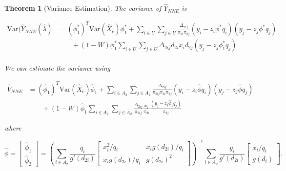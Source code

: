 \documentclass[12pt]{article}
\newtheorem{theorem}{Theorem}
\newcommand{\Var}{{\text{Var}}}
\begin{document}
\begin{theorem}[Variance Estimation]
  The variance of $\hat Y_{NNE}$ is 

  \begin{align*}
    \Var(\hat Y_{NNE}(\hat \lambda)
    &= (\phi_1^*)^T \Var(\hat X_c) \phi_1^* + 
    \sum_{i \in U} \sum_{j \in U} \frac{\Delta_{2ij}}{\pi_{2i}\pi_{2j}} 
      (y_i - z_i \phi^* q_i)(y_j - z_j \phi^* q_j)\\
    &\qquad + (1 - W)\phi_1^* \sum_{i \in U} \sum_{j \in U} \Delta_{2ij} d_{2i} x_i
      d_{2j}(y_j - z_j \phi^*_1 q_j)\\
  \end{align*}

  We can estimate the variance using

  \begin{align*}
    \hat V_{NNE} 
    &= (\hat \phi_1)^T \Var(\hat X_c) \hat \phi_1 + 
    \sum_{i \in A_2} \sum_{j \in A_2} \frac{\Delta_{2ij}}{\pi_{2ij}\pi_{2i}\pi_{2j}} 
    (y_i - z_i \hat \phi q_i)(y_j - z_j \hat \phi q_j) \\
    &\qquad + (1 - W)\hat \phi_1 \sum_{i \in A_2} \sum_{j \in A_2} \frac{\Delta_{2ij}}{\pi_{2ij}}
    \frac{x_i}{\pi_{2i}} \frac{(y_j - z_j \hat \phi_1 q_j)}{\pi_{2j}}
  \end{align*}

  where 
  
  $$\hat \phi =
  \begin{bmatrix}
    \hat \phi_1 \\ \hat \phi_2
  \end{bmatrix} = 
  \left(\sum_{i \in A_2} \frac{q_i}{g'(d_{2i})} 
  \begin{bmatrix}
    x_i^2 / q_i & x_i g(d_{2i}) / q_i \\
    x_i g(d_{2i}) / q_i & g(d_{2i})^2
  \end{bmatrix}
  \right)^{-1}
  \sum_{i \in A_2} \frac{y_i}{g'(d_{2i})} 
  \begin{bmatrix} x_i / q_i \\ g(d_i) \end{bmatrix}.
  $$
\end{theorem}
\end{document}
